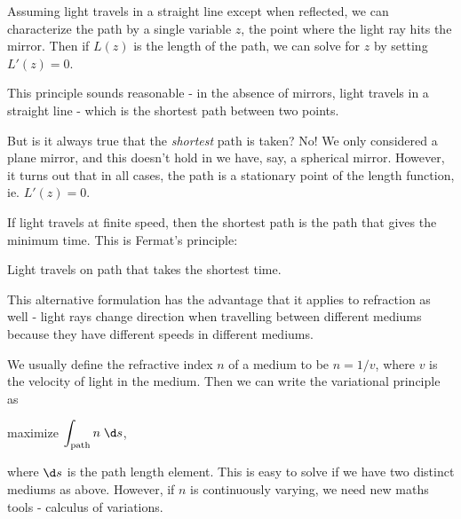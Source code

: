 \documentclass[a4paper]{article}
\begin{document}
Assuming light travels in a straight line except when reflected, we can characterize the path by a single variable $z$, the point where the light ray hits the mirror. Then if $L(z)$ is the length of the path, we can solve for $z$ by setting $L'(z) = 0$.

This principle sounds reasonable - in the absence of mirrors, light travels in a straight line - which is the shortest path between two points.

But is it always true that the \emph{shortest} path is taken? No! We only considered a plane mirror, and this doesn't hold in we have, say, a spherical mirror. However, it turns out that in all cases, the path is a stationary point of the length function, ie. $L'(z) = 0$.

If light travels at finite speed, then the shortest path is the path that gives the minimum time. This is Fermat's principle:
\begin{center}
  Light travels on path that takes the shortest time.
\end{center}
This alternative formulation has the advantage that it applies to refraction as well - light rays change direction when travelling between different mediums because they have different speeds in different mediums.

We usually define the refractive index $n$ of a medium to be $n = 1/v$, where $v$ is the velocity of light in the medium. Then we can write the variational principle as
\begin{center}
  maximize $\displaystyle \int_{\text{path}} n\;\d s$,
\end{center}
where $\d s$ is the path length element. This is easy to solve if we have two distinct mediums as above. However, if $n$ is continuously varying, we need new maths tools - calculus of variations. 
\end{document}
